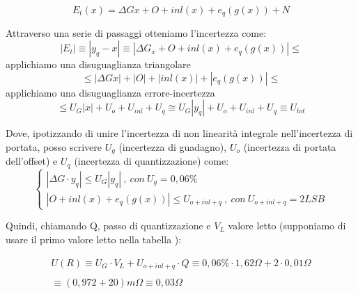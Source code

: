 \begin{equation}
    E_t(x) = \Delta Gx + O + inl(x) + e_q(g(x)) + N
\end{equation}


Attraverso una serie di passaggi otteniamo l'incertezza come:
\begin{equation}
    |E_t| \equiv |y_q - x| \equiv | \Delta G_x + O + inl(x) + e_q(g(x)) | \leq 
\end{equation}
applichiamo una disuguaglianza triangolare
\begin{equation*}
    \leq | \Delta Gx | + | O | + | inl(x) | + | e_q(g(x)) | \leq 
\end{equation*}
applichiamo una disuguaglianza errore-incertezza
\begin{equation*}
    \leq U_G|x| + U_o + U_{inl} + U_q \cong U_G|y_q| + U_o + U_{inl} +U_q \equiv U_{tot}
\end{equation*}

Dove, ipotizzando di unire l'incertezza di non linearità integrale nell'incertezza di portata, posso scrivere $U_g$ (incertezza di guadagno), $U_o$ (incertezza di portata dell'offset) e $U_q$ (incertezza di quantizzazione) come: 
\begin{equation}
\left\{\begin{array}{l}
    | \Delta G \cdot y_q | \leq U_G |y_q| \ , \ con \ U_g=0,06\% \\
| O + inl(x) + e_q(g(x)) | \leq U_{o+inl+q} \ , \ con \ U_{o+inl+q}=2LSB
\end{array}\right.
\end{equation}

Quindi, chiamando Q, passo di quantizzazione e $V_L$ valore letto (supponiamo di usare il primo valore letto nella tabella \label{mult_port}):

\begin{equation*}
\begin{array}{l}
U(R) \equiv U_G \cdot V_L + U_{o+inl+q} \cdot Q \equiv 0,06\% \cdot 1,62\Omega + 2 \cdot 0,01 \Omega \\ \\
\equiv (0,972 + 20) m\Omega \equiv 0,03 \Omega
\end{array}
\end{equation*}


